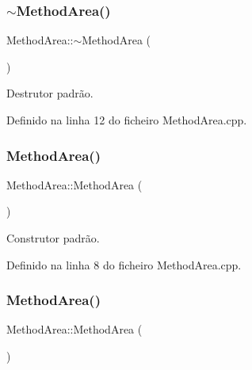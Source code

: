 \subsubsection{\texorpdfstring{$\sim$\+Method\+Area()}{~MethodArea()}}
{\footnotesize\ttfamily Method\+Area\+::$\sim$\+Method\+Area (\begin{DoxyParamCaption}{ }\end{DoxyParamCaption})}



Destrutor padrão. 



Definido na linha 12 do ficheiro Method\+Area.\+cpp.

\mbox{\label{classMethodArea_a6e9aac39975424e6c0ab3c29535aca75}} 
\subsubsection{\texorpdfstring{Method\+Area()}{MethodArea()}\hspace{0.1cm}{\footnotesize\ttfamily [1/2]}}
{\footnotesize\ttfamily Method\+Area\+::\+Method\+Area (\begin{DoxyParamCaption}{ }\end{DoxyParamCaption})\hspace{0.3cm}{\ttfamily [private]}}



Construtor padrão. 



Definido na linha 8 do ficheiro Method\+Area.\+cpp.

\mbox{\label{classMethodArea_a3a51cf2f998faa40ff46f17019f59e0a}} 
\subsubsection{\texorpdfstring{Method\+Area()}{MethodArea()}\hspace{0.1cm}{\footnotesize\ttfamily [2/2]}}
{\footnotesize\ttfamily Method\+Area\+::\+Method\+Area (\begin{DoxyParamCaption}\item[{\hyperlink{classMethodArea}{Method\+Area} const \&}]{ }\end{DoxyParamCaption})\hspace{0.3cm}{\ttfamily [private]}}



